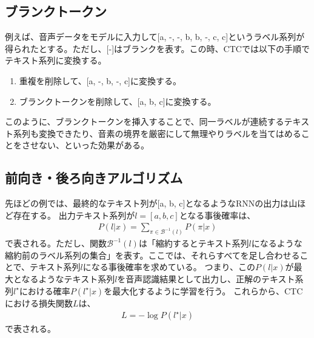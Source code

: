 \documentclass{ltjsarticle}
\begin{document}
\subsection{ブランクトークン}
例えば、音声データをモデルに入力して[a, -, -, b, b, -, c, c]というラベル系列が得られたとする。ただし、[-]はブランクを表す。この時、CTCでは以下の手順でテキスト系列に変換する。
\begin{enumerate}
  \item 重複を削除して、[a, -, b, -, c]に変換する。
  \item ブランクトークンを削除して、[a, b, c]に変換する。
\end{enumerate}
このように、ブランクトークンを挿入することで、同一ラベルが連続するテキスト系列も変換できたり、音素の境界を厳密にして無理やりラベルを当てはめることをさせない、といった効果がある。

\subsection{前向き・後ろ向きアルゴリズム}
先ほどの例では、最終的なテキスト列が[a, b, c]となるようなRNNの出力は山ほど存在する。
出力テキスト系列が$l=[a,b,c]$となる事後確率は、
\begin{align}
  P(l|x) = \sum_{\pi \in \mathcal{B}^{-1}(l) }P(\pi|x)
\end{align}
で表される。ただし、関数$\mathcal{B}^{-1}(l)$は「縮約するとテキスト系列$l$になるような縮約前のラベル系列の集合」を表す。ここでは、それらすべてを足し合わせることで、テキスト系列$l$になる事後確率を求めている。
つまり、この$P(l|x)$が最大となるようなテキスト系列$l$を音声認識結果として出力し、正解のテキスト系列$l^{\star}$における確率$P(l^{\star}|x)$を最大化するように学習を行う。
これらから、CTCにおける損失関数$L$は、
\begin{align}
  L = -\log P(l^{\star}|x)
\end{align}
で表される。
\end{document}
